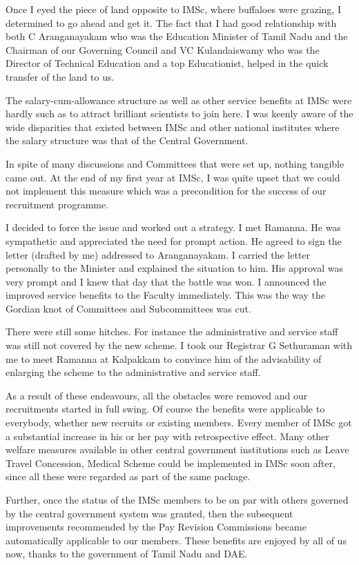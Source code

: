 Once I eyed the piece of land opposite to IMSc, where buffaloes were 
grazing, I determined to go ahead and get it. The fact that I had good 
relationship with both C Aranganayakam who was the Education Minister of 
Tamil Nadu and the Chairman of our Governing Council and VC 
Kulandaiswamy who was the Director of Technical Education and a top 
Educationist, helped in the quick transfer of the land to us.

The salary-cum-allowance structure as well as other service benefits at 
IMSc were hardly such as to attract brilliant scientists to join here. I 
was keenly aware of the wide disparities that existed between IMSc and 
other national institutes where the salary structure was that of the 
Central Government.

In spite of many discussions and Committees that were set up, nothing 
tangible came out. At the end of my first year at IMSc, I was quite 
upset that we could not implement this measure which was a precondition 
for the success of our recruitment programme.

I decided to force the issue and worked out a strategy. I met Ramanna. 
He was sympathetic and appreciated the need for prompt action. He agreed 
to sign the letter (drafted by me) addressed to Aranganayakam. I carried 
the letter personally to the Minister and explained the situation to 
him. His approval was very prompt and I knew that day that the battle 
was won. I announced the improved service benefits to the Faculty 
immediately. This was the way the Gordian knot of Committees and 
Subcommittees was cut.

There were still some hitches. For instance the administrative and 
service staff was still not covered by the new scheme. I took our 
Registrar G Sethuraman with me to meet Ramanna at Kalpakkam to convince 
him of the advisability of enlarging the scheme to the administrative 
and service staff.

As a result of these endeavours, all the obstacles were removed and our 
recruitments started in full swing. Of course the benefits were 
applicable to everybody, whether new recruits or existing members. Every 
member of IMSc got a substantial increase in his or her pay with 
retrospective effect. Many other welfare measures available in other 
central government institutions such as Leave Travel Concession, Medical 
Scheme could be implemented in IMSc soon after, since all these were 
regarded as part of the same package.

Further, once the status of the IMSc members to be on par with others 
governed by the central government system was granted, then the 
subsequent improvements recommended by the Pay Revision Commissions 
became automatically applicable to our members. These benefits are 
enjoyed by all of us now, thanks to the government of Tamil Nadu and 
DAE.
\smallskip

